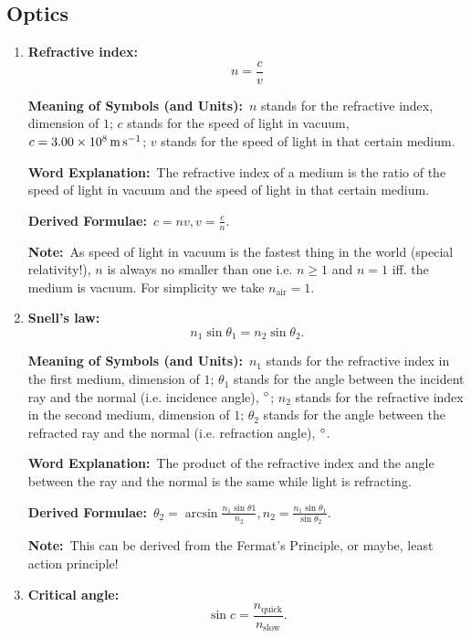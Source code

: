 \documentclass[8pt]{article}
\newcommand{\MeanSymb}{\textbf{Meaning of Symbols (and Units):}\ }
\newcommand{\WordExpl}{\textbf{Word Explanation:}\ }
\newcommand{\DeriForm}{\textbf{Derived Formulae:}\ }
\newcommand{\Note}{\textbf{Note:}\ }
\begin{document}
        \subsection{Optics}
            \begin{enumerate}
                \item \textbf{Refractive index:}
                \[
                    n = \frac{c}{v}
                \]

                \MeanSymb \(n\) stands for the refractive index, dimension of \(1\); \(c\) stands for the speed of light in vacuum, \(c = \qty{3.00 e 8}{\metre \per \second}\); \(v\) stands for the speed of light in that certain medium.

                \WordExpl The refractive index of a medium is the ratio of the speed of light in vacuum and the speed of light in that certain medium.

                \DeriForm \(c = nv, v = \frac{c}{n}\).

                \Note As speed of light in vacuum is the fastest thing in the world (special relativity!), \(n\) is always no smaller than one i.e. \(n \geq 1\) and \(n = 1\) iff. the medium is vacuum. For simplicity we take \(n_{\text{air}} = 1\).
                
                \item \textbf{Snell's law:}
                \[
                    n_1 \sin \theta_1 = n_2 \sin \theta_2.
                \]

                \MeanSymb \(n_1\) stands for the refractive index in the first medium, dimension of \(1\); \(\theta_1\) stands for the angle between the incident ray and the normal (i.e. incidence angle), \(^\circ\); \(n_2\) stands for the refractive index in the second medium, dimension of \(1\); \(\theta_2\) stands for the angle between the refracted ray and the normal (i.e. refraction angle), \(^\circ\).

                \WordExpl The product of the refractive index and the angle between the ray and the normal is the same while light is refracting.

                \DeriForm \(\theta_2 = \arcsin \frac{n_1 \sin \theta 1}{n_2}, n_2 = \frac{n_1 \sin \theta_1}{\sin\theta_2}\).

                \Note This can be derived from the Fermat's Principle, or maybe, least action principle!
                
                \item \textbf{Critical angle:}
                \[
                    \sin c = \frac{n_{\text{quick}}}{n_{\text{slow}}}.
                \]


\end{enumerate}
\end{document}
